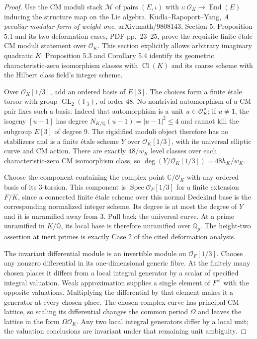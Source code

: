 \begin{proof}
Use the CM moduli stack $\mathcal M$ of pairs $(E,\iota)$ with
$\iota:\mathcal O_K\to\operatorname{End}(E)$ inducing the
structure map on the Lie algebra. Kudla--Rapoport--Yang,
\emph{A peculiar modular form of weight one}, arXiv:math/9808143,
Section 5, Proposition 5.1 and its two deformation cases,
PDF pp.~23--25, prove the requisite finite étale CM moduli
statement over $\mathcal O_K$. This section explicitly allows
arbitrary imaginary quadratic $K$. Proposition 5.3 and
Corollary 5.4 identify its geometric characteristic-zero
isomorphism classes with $\operatorname{Cl}(K)$ and its coarse
scheme with the Hilbert class field's integer scheme.

Over $\mathcal O_K[1/3]$, add an ordered basis of $E[3]$.
The choices form a finite étale torsor with group
$\operatorname{GL}_2(\mathbb F_3)$, of order $48$.
No nontrivial automorphism of a CM pair fixes such a basis.
Indeed that automorphism is a unit $u\in\mathcal O_K^\times$;
if $u\ne1$, the isogeny $[u-1]$ has degree
$N_{K/\mathbb Q}(u-1)=|u-1|^2\le4$ and cannot kill the
subgroup $E[3]$ of degree $9$. The rigidified moduli object
therefore has no stabilizers and is a finite étale scheme
$Y$ over $\mathcal O_K[1/3]$, with its universal elliptic curve
and CM action. There are exactly $48/w_K$ level classes over
each characteristic-zero CM isomorphism class, so
$\deg(Y/\mathcal O_K[1/3])=48h_K/w_K$.

Choose the component containing the complex point
$\mathbb C/\mathcal O_K$ with any ordered basis of its
$3$-torsion. This component is
$\operatorname{Spec}\mathcal O_F[1/3]$ for a finite extension
$F/K$, since a connected finite étale scheme over this
normal Dedekind base is the corresponding normalized integer
scheme. Its degree is at most the degree of $Y$ and it is
unramified away from $3$. Pull back the universal curve.
At a prime unramified in $K/\mathbb Q$, its local base is
therefore unramified over $\mathbb Q_p$. The height-two
assertion at inert primes is exactly Case 2 of the cited
deformation analysis.

The invariant differential module is an invertible module on
$\mathcal O_F[1/3]$. Choose any nonzero differential in its
one-dimensional generic fibre. At the finitely many chosen
places it differs from a local integral generator by a scalar
of specified integral valuation. Weak approximation supplies
a single element of $F^\times$ with the opposite valuations.
Multiplying the differential by that element makes it a
generator at every chosen place. The chosen complex curve
has principal CM lattice, so scaling its differential changes
the common period $\Omega$ and leaves the lattice in the form
$\Omega\mathcal O_K$. Any two local integral generators
differ by a local unit; the valuation conclusions are invariant
under that remaining unit ambiguity.
\end{proof}

